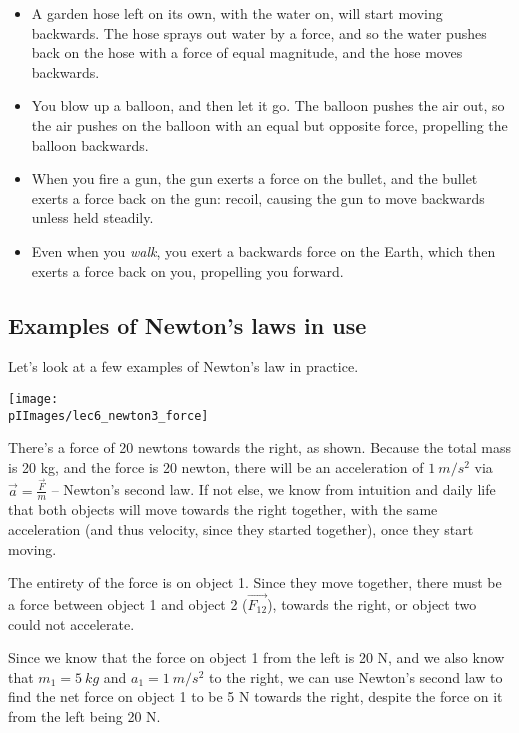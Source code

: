 \begin{itemize}
\item A garden hose left on its own, with the water on, will start moving backwards. The hose sprays out water by a force, and so the water pushes back on the hose with a force of equal magnitude, and the hose moves backwards.
\item You blow up a balloon, and then let it go. The balloon pushes the air out, so the air pushes on the balloon with an equal but opposite force, propelling the balloon backwards.
\item When you fire a gun, the gun exerts a force on the bullet, and the bullet exerts a force back on the gun: recoil, causing the gun to move backwards unless held steadily.
\item Even when you \emph{walk}, you exert a backwards force on the Earth, which then exerts a force back on you, propelling you forward.
\end{itemize}

\subsection{Examples of Newton's laws in use}

Let's look at a few examples of Newton's law in practice.

\begin{center}
\texttt{[image: \\pIImages/lec6\_newton3\_force]}
\end{center}

There's a force of 20 newtons towards the right, as shown. Because the total mass is 20 kg, and the force is 20 newton, there will be an acceleration of $\SI{1}{m/s^2}$ via $\displaystyle \vec{a} = \frac{\vec{F}}{m}$ -- Newton's second law. If not else, we know from intuition and daily life that both objects will move towards the right together, with the same acceleration (and thus velocity, since they started together), once they start moving.

The entirety of the force is on object 1. Since they move together, there must be a force between object 1 and object 2 ($\vec{F_{12}}$), towards the right, or object two could not accelerate.

Since we know that the force on object 1 from the left is 20 N, and we also know that $m_1 = \SI{5}{kg}$ and $a_1 = \SI{1}{m/s^2}$ to the right, we can use Newton's second law to find the net force on object 1 to be 5 N towards the right, despite the force on it from the left being 20 N.

